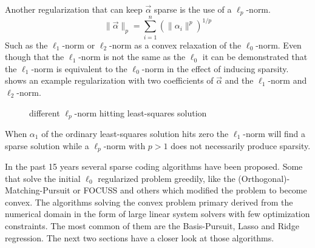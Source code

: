 Another regularization that can keep $\vec{\alpha}$ sparse is the use of a
$\ell_p$-norm.
\begin{equation*}
\lVert \vec{\alpha}\rVert_p = \sum_{i=1}^n\left(\lVert \alpha_i
\lVert^p\right)^{1/p}
\end{equation*}
Such as the $\ell_1$-norm or $\ell_2$-norm as a convex relaxation of
the $\ell_0$-norm. Even though that the $\ell_1$-norm is not the same as the
$\ell_0$ it can be demonstrated that the $\ell_1$-norm is equivalent to the
$\ell_0$-norm in the effect of inducing sparsity. 
 shows an example regularization with two coefficients
of $\vec{\alpha}$ and the $\ell_1$-norm and $\ell_2$-norm.
\begin{figure}[h]
\centering
{}
\vspace{2mm}
\caption[$\ell_p$ regularization]{different $\ell_p$-norm hitting least-squares
solution}
\label{fig:sparse}
\end{figure}
When $\alpha_1$ of the ordinary least-squares solution hits zero the
$\ell_1$-norm will find a sparse solution while a $\ell_p$-norm with $p>1$ does
not necessarily produce sparsity.

In the past 15 years several sparse coding algorithms have been proposed. Some
that solve the initial $\ell_0$ regularized problem greedily, like
the (Orthogonal)-Matching-Pursuit or FOCUSS and others which modified the
problem to become convex. The algorithms solving the convex problem primary
derived from the numerical domain in the form of large linear system solvers
with few optimization constraints. The most common of them are the
Basis-Pursuit, Lasso and Ridge regression. The next two sections have a
closer look at those algorithms. 

